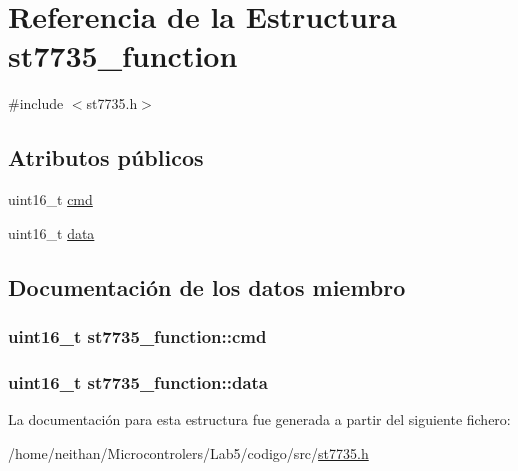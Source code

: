 \hypertarget{structst7735__function}{}\section{Referencia de la Estructura st7735\+\_\+function}
\label{structst7735__function}


{\ttfamily \#include $<$st7735.\+h$>$}

\subsection*{Atributos públicos}
\begin{DoxyCompactItemize}
\item 
uint16\+\_\+t \hyperlink{structst7735__function_a03ff5a54a8bc94c518065cb0cc46b216}{cmd}
\item 
uint16\+\_\+t \hyperlink{structst7735__function_a4580ffb7dd0866a1a3d8684b6f1a670f}{data}
\end{DoxyCompactItemize}


\subsection{Documentación de los datos miembro}
\subsubsection[{\texorpdfstring{cmd}{cmd}}]{\setlength{\rightskip}{0pt plus 5cm}uint16\+\_\+t st7735\+\_\+function\+::cmd}\hypertarget{structst7735__function_a03ff5a54a8bc94c518065cb0cc46b216}{}\label{structst7735__function_a03ff5a54a8bc94c518065cb0cc46b216}
\subsubsection[{\texorpdfstring{data}{data}}]{\setlength{\rightskip}{0pt plus 5cm}uint16\+\_\+t st7735\+\_\+function\+::data}\hypertarget{structst7735__function_a4580ffb7dd0866a1a3d8684b6f1a670f}{}\label{structst7735__function_a4580ffb7dd0866a1a3d8684b6f1a670f}


La documentación para esta estructura fue generada a partir del siguiente fichero\+:\begin{DoxyCompactItemize}
\item 
/home/neithan/\+Microcontrolers/\+Lab5/codigo/src/\hyperlink{st7735_8h}{st7735.\+h}\end{DoxyCompactItemize}

